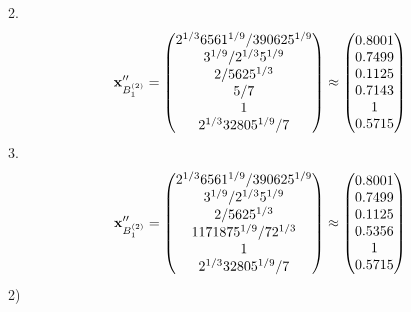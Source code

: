 \documentclass[10pt,a4paper]{article}
\begin{document}
	2.
	\[
		\bold{x}''_{B_1^{(2)}} = 
		\begin{pmatrix}
			{{2^ {1 / 3}}{6561^ {1 / 9}}} / {{390625^ {1 / 9}}} \\
			{{3^ {1 / 9}}} / {{2^ {1 / 3}}{5^ {1 / 9}}} \\
			{{2}} / {{5625^ {1 / 3}}} \\
			{{5}} / {{7}} \\
			{1}{} \\
			{{2^ {1 / 3}}{32805^ {1 / 9}}} / {{7}} \\
		\end{pmatrix}
		\approx
		\begin{pmatrix}
			0.8001   \\
			0.7499   \\
			0.1125   \\
			0.7143   \\
			1        \\
			0.5715   \\
		\end{pmatrix}
	\]
	3.
	\[
		\bold{x}''_{B_1^{(2)}} = 
		\begin{pmatrix}
			{{2^ {1 / 3}}{6561^ {1 / 9}}} / {{390625^ {1 / 9}}} \\
			{{3^ {1 / 9}}} / {{2^ {1 / 3}}{5^ {1 / 9}}} \\
			{{2}} / {{5625^ {1 / 3}}} \\
			{{1171875^ {1 / 9}}} / {{7}{2^ {1 / 3}}} \\
			{1}{} \\
			{{2^ {1 / 3}}{32805^ {1 / 9}}} / {{7}} \\
		\end{pmatrix}
		\approx
		\begin{pmatrix}
			0.8001   \\
			0.7499   \\
			0.1125   \\
			0.5356   \\
			1        \\
			0.5715   \\
		\end{pmatrix}
	\]
	2)
\end{document}

